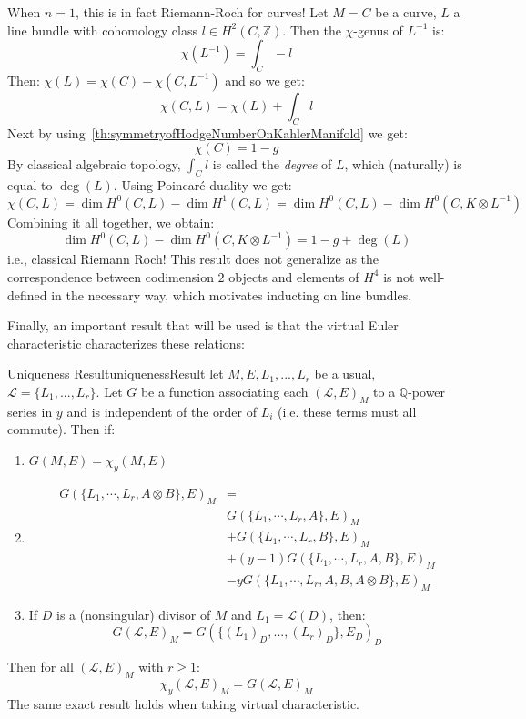 \documentclass{book}
\newcommand{\Q}{{\mathbb{Q}}}
\newcommand{\Z}{{\mathbb{Z}}}
\newcommand{\CL}{{\mathcal{L}}}
\renewcommand{\deg}{{\operatorname{deg}}}
\begin{document}
When $n = 1$, this is in fact Riemann-Roch for curves! Let $M = C$ be a curve, $L$ a line bundle with
cohomology class $l \in H^2(C, \Z)$. Then the $\chi$-genus of $L^{-1}$ is:
\[
  \chi(L^{-1}) = \int_C-l
\]
Then: $\chi(L) = \chi(C) - \chi(C, L^{-1})$ and so we get:
\[
  \chi(C, L) = \chi(L) + \int_C l
\]
Next by using~\cref{th:symmetryofHodgeNumberOnKahlerManifold} we get:
\[
  \chi(C) = 1 - g
\]
By classical algebraic topology, $\int_C l$ is called the \emph{degree} of $L$, which (naturally) is equal to
$\deg(L)$. Using Poincar\'e duality we get:
\[
  \chi(C, L) = \dim H^0(C, L) - \dim H^1(C, L) = \dim H^0(C, L) - \dim H^0(C, K\otimes L^{-1})
\]
Combining it all together, we obtain:
\[
  \dim H^0(C, L) - \dim H^0(C, K\otimes L^{-1}) = 1 - g + \deg(L)
\]
i.e., classical Riemann Roch! This result does not generalize as the correspondence between codimension $2$
objects and elements of $H^4$ is not well-defined in the necessary way, which motivates inducting on line
bundles.


Finally, an important result that will be used is that the virtual Euler characteristic characterizes these relations:

\begin{thm}{Uniqueness Result}{uniquenessResult}
  let $M,E, L_1, ..., L_r$ be a usual, $\CL = \{L_1, ..., L_r\}$. Let $G$ be a function associating each $(\CL,
  E)_M$ to a $\Q$-power series in $y$ and is independent of the order of $L_i$ (i.e. these terms must all
  commute). Then if:
  \begin{enumerate}
    \item $G(M, E) = \chi_y(M,E)$
    \item
  \begin{align*}
  G(\{L_1,\cdots,L_r,A\otimes B\},E)_M &=\\
                 &G(\{L_1,\cdots,L_r,A\},E)_M\\
                 &+ G(\{L_1,\cdots,L_r,B\},E)_M\\
                 &+ (y-1)G(\{L_1,\cdots,L_r,A,B\},E)_M\\
                 &- yG(\{L_1,\cdots,L_r,A,B,A\otimes B\},E)_M
  \end{align*}
  \item If $D$ is a (nonsingular) divisor of $M$ and $L_1 = \CL(D)$, then:
    \[
      G(\CL, E)_M = G(\{(L_1)_D, ..., (L_r)_D\}, E_D)_D
    \]
  \end{enumerate}
  Then for all $(\CL, E)_M$ with $r \ge 1$:
  \[
    \chi_y(\CL, E)_M = G(\CL, E)_M
  \]
  The same exact result holds when taking virtual characteristic.
\end{thm}
\end{document}

